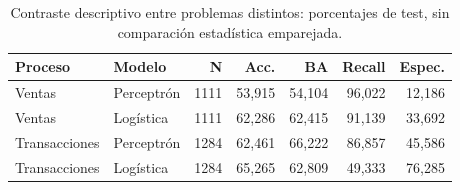 \begin{table}[htbp]
\centering\small
\caption{Contraste descriptivo entre problemas distintos: porcentajes de test, sin comparación estadística emparejada.}\label{tab:tf-comparacion}
\begin{tabular}{llrrrrr}\toprule
Proceso & Modelo & N & Acc. & BA & Recall & Espec. \\ \midrule
Ventas & Perceptrón & 1111 & 53,915 & 54,104 & 96,022 & 12,186 \\
Ventas & Logística & 1111 & 62,286 & 62,415 & 91,139 & 33,692 \\
Transacciones & Perceptrón & 1284 & 62,461 & 66,222 & 86,857 & 45,586 \\
Transacciones & Logística & 1284 & 65,265 & 62,809 & 49,333 & 76,285 \\
\bottomrule\end{tabular}
\end{table}
